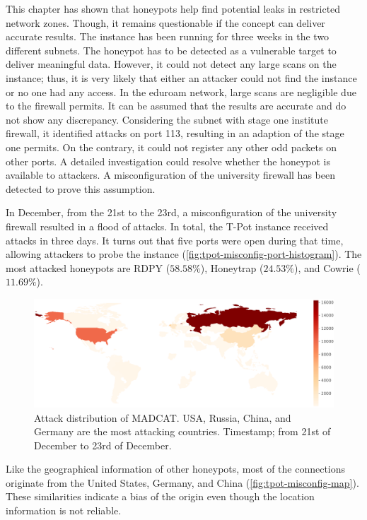 This chapter has shown that honeypots help find potential leaks in restricted network zones.
Though, it remains questionable if the concept can deliver accurate results.
The instance has been running for three weeks in the two different subnets.
The honeypot has to be detected as a vulnerable target to deliver meaningful data.
However, it could not detect any large scans on the instance; thus, it is very likely that either an attacker could not find the instance or no one had any access.
In the eduroam network, large scans are negligible due to the firewall permits.
It can be assumed that the results are accurate and do not show any discrepancy.
Considering the subnet with stage one institute firewall, it identified attacks on port 113, resulting in an adaption of the stage one permits.
On the contrary, it could not register any other odd packets on other ports.
A detailed investigation could resolve whether the honeypot is available to attackers.
A misconfiguration of the university firewall has been detected to prove this assumption.

In December, from the 21st to the 23rd, a misconfiguration of the university firewall resulted in a flood of attacks.
In total, the T-Pot instance received  attacks in three days.
It turns out that five ports were open during that time, allowing attackers to probe the instance (\autoref{fig:tpot-misconfig-port-histogram}).
The most attacked honeypots are RDPY ($58.58\%$), Honeytrap ($24.53\%$), and Cowrie ($11.69\%$).

\begin{figure}[ht]
    \centering
    \includegraphics[width=\textwidth]{figures/tpot-misconfig-overview-map.pdf}
    \caption[Attack distribution of MADCAT]{
        Attack distribution of MADCAT.
        USA, Russia, China, and Germany are the most attacking countries.
        Timestamp; from 21st of December to 23rd of December.
    }
    \label{fig:tpot-misconfig-map}
\end{figure}

Like the geographical information of other honeypots, most of the connections originate from the United States, Germany, and China (\autoref{fig:tpot-misconfig-map}).
These similarities indicate a bias of the origin even though the location information is not reliable.

